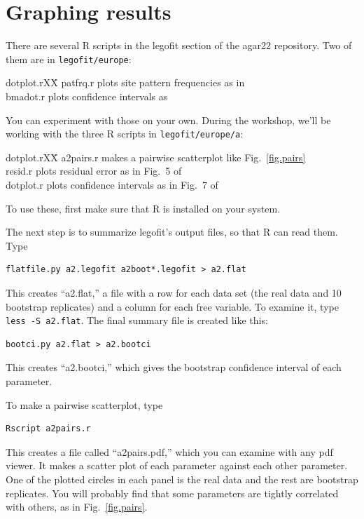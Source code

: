 \documentclass[11pt]{article}
\newenvironment{leftindent}%
{\begin{list}{}%
         {\setlength{\leftmargin}{2em}}%
         \item[]%
}{\end{list}}
\begin{document}
\section{Graphing results}
\label{sec.graph}
There are several R scripts in the legofit section of the agar22
repository. Two of them are in \texttt{legofit/europe}:
\begin{leftindent}
\begin{tabbing}
  dotplot.rXX\=\kill
patfrq.r \> plots site pattern frequencies as in
    \citet[Fig.~3]{Rogers:arXiv-2201.02668}\\ 
bmadot.r \> plots confidence intervals as 
  \citet[Fig.~7]{Rogers:PCJ-2-e32}
\end{tabbing}
\end{leftindent}
You can experiment with those on your own. During the workshop, we'll
be working with the three R scripts in \texttt{legofit/europe/a}:
\begin{leftindent}
\begin{tabbing}
  dotplot.rXX\=\kill
a2pairs.r \> makes a pairwise scatterplot like
  Fig.~\ref{fig.pairs}\\
resid.r \> plots residual error as in Fig.~5 of \citep{Rogers:PCJ-2-e32}\\
dotplot.r \> plots confidence intervals as in Fig.~7 of
  \citep{Rogers:PCJ-2-e32}
\end{tabbing}
\end{leftindent}
To use these, first make sure that R is installed on your system.

The next step is to summarize legofit's output files, so that R can
read them. Type
\begin{verbatim}
flatfile.py a2.legofit a2boot*.legofit > a2.flat
\end{verbatim}
This creates ``a2.flat,'' a file with a row for each data set (the
real data and 10 bootstrap replicates) and a column for each free
variable. To examine it, type \texttt{less -S a2.flat}. The final
summary file is created like this:
\begin{verbatim}
bootci.py a2.flat > a2.bootci
\end{verbatim}
This creates ``a2.bootci,'' which gives the bootstrap confidence
interval of each parameter.

To make a pairwise scatterplot, type
\begin{verbatim}
Rscript a2pairs.r
\end{verbatim}
This creates a file called ``a2pairs.pdf,'' which you can examine with
any pdf viewer. It makes a scatter plot of each parameter against each
other parameter. One of the plotted circles in each panel is the real
data and the rest are bootstrap replicates. You will probably find
that some parameters are tightly correlated with others, as in
Fig.~\ref{fig.pairs}.
\end{document}

